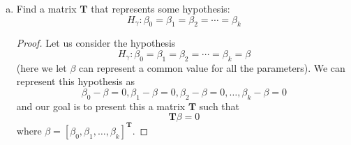 \documentclass[12pt]{article}
\newcommand{\T}{\mathbf{T}}
\begin{document}
\begin{enumerate}[1.]
\begin{enumerate}[a)]
                    \item Find a matrix $\T$ that represents some hypothesis: 
                    \[H_\gamma : \beta_0 = \beta_1 = \beta_2 = \cdots = \beta_k\]
                    
                    \begin{proof}
                        Let us consider the hypothesis 
                        \[H_\gamma : \beta_0 = \beta_1 = \beta_2 = \cdots = \beta_k = \beta\]
                        (here we let $\beta$ can represent a common value for all the parameters).
                        We can represent this hypothesis as 
                        \[\beta_0 - \beta = 0, \beta_1 - \beta = 0, \beta_2 - \beta = 0, \ldots, \beta_k - \beta = 0\]
                        and our goal is to present this a matrix $\T$ such that 
                        \[\T \beta = 0\]
                        where $\beta = [\beta_0, \beta_1, \ldots, \beta_k]^\T$.


\end{proof}
\end{enumerate}
\end{enumerate}
\end{document}

